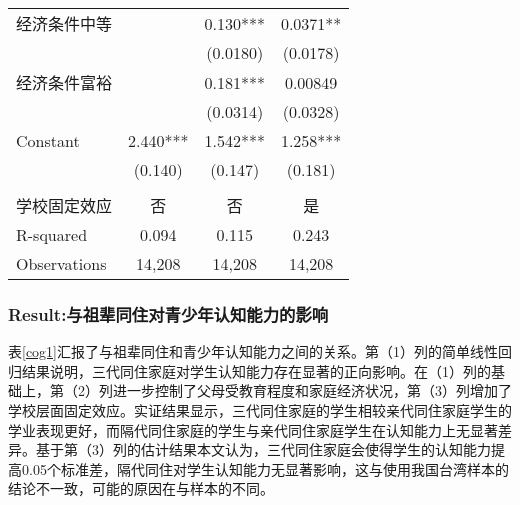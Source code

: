 \documentclass{beamer}
\begin{document}
\begin{frame}
\begin{table}[!htbp]
{\begin{tabular}{lccc}
经济条件中等       &           & 0.130***   & 0.0371**  \\
             &           & (0.0180)   & (0.0178)  \\
经济条件富裕       &           & 0.181***   & 0.00849   \\
             &           & (0.0314)   & (0.0328)  \\
Constant     & 2.440***  & 1.542***   & 1.258***  \\
             & (0.140)   & (0.147)    & (0.181)   \\
             &           &            &          \\
学校固定效应  & 否    	& 否     	& 是  \\
R-squared    & 0.094     & 0.115      & 0.243 \\
Observations & 14,208    & 14,208     & 14,208    \\
\hline
\end{tabular}}
\end{table}
\end{frame}

\begin{frame}
	\frametitle{Result:与祖辈同住对青少年认知能力的影响}
表\ref{cog1}汇报了与祖辈同住和青少年认知能力之间的关系。第（1）列的简单线性回归结果说明，三代同住家庭对学生认知能力存在显著的正向影响。在（1）列的基础上，第（2）列进一步控制了父母受教育程度和家庭经济状况，第（3）列增加了学校层面固定效应。实证结果显示，三代同住家庭的学生相较亲代同住家庭学生的学业表现更好，而隔代同住家庭的学生与亲代同住家庭学生在认知能力上无显著差异。基于第（3）列的估计结果本文认为，三代同住家庭会使得学生的认知能力提高0.05个标准差，隔代同住对学生认知能力无显著影响，这与\citet{pong_co-resident_2010}使用我国台湾样本的结论不一致，可能的原因在与样本的不同。
\end{frame}
\end{document}

